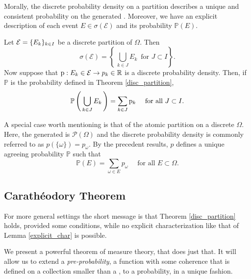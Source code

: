 Morally, the discrete probability density on a partition describes a unique and consistent probability on the generated \sigmaalg. 
Moreover, we have an explicit description of each event $E\in\sigma(\mathcal{E})$ and its probability $\mathbb{P}(E)$.

\begin{my_lemma}
	\label{explicit_char}
	Let $\mathcal{E}=\{ E_k \}_{k\in I}$ be a discrete partition of $\Omega$. Then
	\[
		\sigma( \mathcal{E} ) = \left\{ \, \bigcup_{k \in J} E_k \, \text{ for }J \subset I \right\}.
	\]
	Now suppose that $\mathrm{p} : E_k \in \mathcal{E} \to p_k \in \mathbb{R}$ is a discrete probability density. Then, if $\mathbb{P}$ is the probability defined in Theorem \ref{disc_partition},
	\[
		\mathbb{P} \left( \, \bigcup_{k \in J} E_k \,\right) = \sum_{k \in J} \mathrm{p}_k \quad \text{ for all }J \subset I.
	\]
\end{my_lemma}
 
\begin{my_remark}
	A special case worth mentioning is that of the atomic partition on a discrete $\Omega$. 
	Here, the \sigmaalg  generated is $\mathcal{P}(\Omega)$ and the discrete probability density is commonly referred to as $p(\{ \omega \})=p_\omega$. 
	By the precedent results, $p$ defines a unique agreeing probability $\mathbb{P}$ such that
	\begin{equation}
		\mathbb{P} \left( E \right) = \sum_{\omega \in E} p_\omega \quad \text{ for all }E \subset \Omega.		
	\end{equation}
\end{my_remark}

\subsection{Carathéodory Theorem}

For more general settings the short message is that Theorem \ref{disc_partition} holds, provided some conditions, while no explicit characterization like that of Lemma \ref{explicit_char} is possible.

We present a powerful theorem of measure theory, that does just that. It will allow us to extend a \textit{pre-probability}, a function with some coherence that is defined on a collection smaller than a \sigmaalg , to a probability, in a unique fashion.

